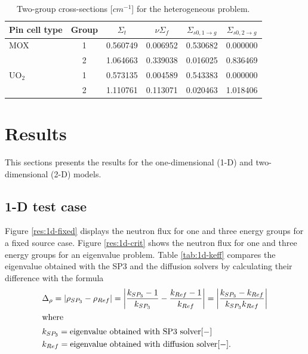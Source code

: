 \documentclass[letterpaper]{article}
\begin{document}
\begin{table}[htbp!]
\centering
\caption{Two-group cross-sections [$cm^{-1}$] for the heterogeneous problem.}
\begin{tabular}{lccccc}
\toprule
Pin cell type & Group & $\Sigma_t$ & $\nu \Sigma_f$ & $\Sigma_{s0, 1 \rightarrow g}$ & $\Sigma_{s0, 2 \rightarrow g}$ \\
\midrule
MOX       & 1     & 0.560749      & 0.006952     & 0.530682     & 0.000000                     \\
          & 2     & 1.064663      & 0.339038     & 0.016025     & 0.836469                     \\

UO$_2$    & 1     & 0.573135      & 0.004589     & 0.543383     & 0.000000                     \\
          & 2     & 1.110761      & 0.113071     & 0.020463     & 1.018406                     \\

\bottomrule
\end{tabular}
\label{tab:bench-xs-hom}
\end{table}


\section{Results}

This sections presents the results for the one-dimensional (1-D) and two-dimensional (2-D) models.

\subsection{1-D test case}
\label{sec:results1d}

Figure \ref{res:1d-fixed} displays the neutron flux for one and three energy groups for a fixed source case.
Figure \ref{res:1d-crit} shows the neutron flux for one and three energy groups for an eigenvalue problem.
Table \ref{tab:1d-keff} compares the eigenvalue obtained with the SP3 and the diffusion solvers by calculating their difference with the formula
\begin{align}
  & \Delta_\rho = \left| \rho_{SP_3} - \rho_{Ref} \right| = \left| \frac{k_{SP_3}-1}{k_{SP_3}} - \frac{k_{Ref}-1}{k_{Ref}} \right| = \left| \frac{k_{SP_3}-k_{Ref}}{k_{SP_3} k_{Ref}} \right| \label{eq:delta-rho} \\
  \intertext{where}
  & k_{SP_3} = \mbox{eigenvalue obtained with SP3 solver} [-] \notag \\
  & k_{Ref} = \mbox{eigenvalue obtained with diffusion solver} [-]. \notag
\end{align}
\end{document}

